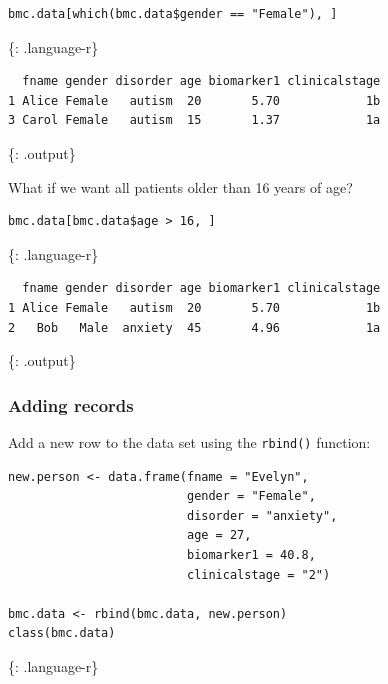 \documentclass[]{article}
\begin{document}
\begin{verbatim}
bmc.data[which(bmc.data$gender == "Female"), ]
\end{verbatim}

\{: .language-r\}

\begin{verbatim}
  fname gender disorder age biomarker1 clinicalstage
1 Alice Female   autism  20       5.70            1b
3 Carol Female   autism  15       1.37            1a
\end{verbatim}

\{: .output\}

What if we want all patients older than 16 years of age?

\begin{verbatim}
bmc.data[bmc.data$age > 16, ]
\end{verbatim}

\{: .language-r\}

\begin{verbatim}
  fname gender disorder age biomarker1 clinicalstage
1 Alice Female   autism  20       5.70            1b
2   Bob   Male  anxiety  45       4.96            1a
\end{verbatim}

\{: .output\}

\subsubsection{Adding records}\label{adding-records}

Add a new row to the data set using the \texttt{rbind()} function:

\begin{verbatim}
new.person <- data.frame(fname = "Evelyn",
                         gender = "Female",
                         disorder = "anxiety",
                         age = 27,
                         biomarker1 = 40.8,
                         clinicalstage = "2")

bmc.data <- rbind(bmc.data, new.person)
class(bmc.data)
\end{verbatim}

\{: .language-r\}
\end{document}
